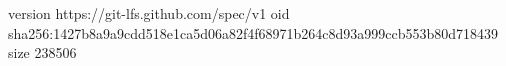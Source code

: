 version https://git-lfs.github.com/spec/v1
oid sha256:1427b8a9a9cdd518e1ca5d06a82f4f68971b264c8d93a999ccb553b80d718439
size 238506
